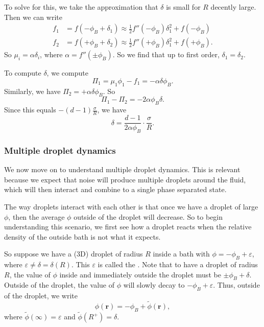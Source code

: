 \documentclass[a4paper]{article}
\begin{document}
To solve for this, we take the approximation that $\delta$ is small for $R$ decently large. Then we can write
\begin{align*}
  f_1 &= f(-\phi_B + \delta_1) \approx \frac{1}{2} f''(-\phi_B) \delta_1^2 + f(-\phi_B)\\
  f_2 &= f(+\phi_B + \delta_2) \approx \frac{1}{2} f''(+\phi_B) \delta_1^2 + f(+\phi_B).
\end{align*}
So $\mu_i = \alpha \delta_i$, where $\alpha = f''(\pm\phi_B)$. So we find that up to first order, $\delta_1 = \delta_2$.

To compute $\delta$, we compute
\[
  \Pi_1 = \mu_1\phi_1 - f_1 = -\alpha \delta \phi_B.
\]
Similarly, we have $\Pi_2 = +\alpha \delta \phi_B$. So
\[
  \Pi_1 - \Pi_2 = -2\alpha \phi_B \delta.
\]
Since this equals $-(d - 1)\frac{\sigma}{R}$, we have
\[
  \delta = \frac{d - 1}{2\alpha \phi_B} \cdot \frac{\sigma}{R}.
\]

\subsubsection*{Multiple droplet dynamics}
We now move on to understand multiple droplet dynamics. This is relevant because we expect that noise will produce multiple droplets around the fluid, which will then interact and combine to a single phase separated state.

The way droplets interact with each other is that once we have a droplet of large $\phi$, then the average $\phi$ outside of the droplet will decrease. So to begin understanding this scenario, we first see how a droplet reacts when the relative density of the outside bath is not what it expects.

So suppose we have a (3D) droplet of radius $R$ inside a bath with $\phi = - \phi_B + \varepsilon$, where $\varepsilon \not= \delta = \delta(R)$. This $\varepsilon$ is called the . Note that to have a droplet of radius $R$, the value of $\phi$ inside and immediately outside the droplet must be $\pm \phi_B + \delta$. Outside of the droplet, the value of $\phi$ will slowly decay to $-\phi_B + \varepsilon$. Thus, outside of the droplet, we write
\[
  \phi(\mathbf{r}) = -\phi_B+ \tilde{\phi}(\mathbf{r}),
\]
where $\tilde{\phi}(\infty) = \varepsilon$ and $\tilde{\phi}(R^+) = \delta$.
\end{document}
